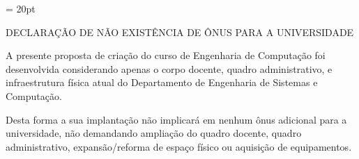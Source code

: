 \documentclass[12pt,a4paper]{article}
\begin{document}
\headsep = 20pt
\setlength{\parindent}{0cm} %
\setlength{\tabcolsep}{5pt} %
\vspace*{2.0cm}

\thispagestyle{firstpage} %
\begin{center}
  DECLARAÇÃO DE NÃO EXISTÊNCIA DE ÔNUS PARA A UNIVERSIDADE
\end{center}

A presente proposta de criação do curso de Engenharia de Computação foi desenvolvida considerando apenas o corpo
docente, quadro administrativo, e infraestrutura física atual do Departamento de Engenharia de Sistemas e Computação.

Desta forma a sua implantação não implicará em nenhum ônus adicional para a universidade,
não demandando ampliação do quadro docente, quadro administrativo, expansão/reforma de
espaço físico ou aquisição de equipamentos.
\end{document}
